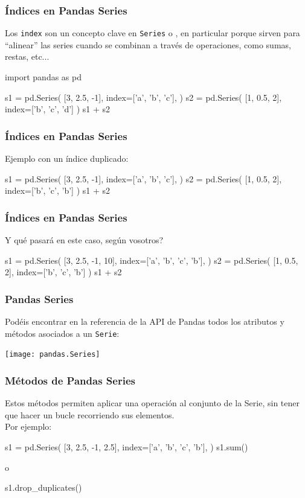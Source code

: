 \documentclass[9pt]{beamer}
\begin{document}
\begin{frame}[fragile]
 \frametitle{Índices en Pandas Series}
  Los {\tt index} son un concepto clave en {\tt Series} o , en particular porque sirven para ``alinear'' las series cuando se combinan a través de operaciones, como sumas, restas, etc...
  \begin{pyconcode}
import pandas as pd
  \end{pyconcode}
  \begin{pyconsole}
s1 = pd.Series(
        [3, 2.5, -1],
        index=['a', 'b', 'c'],
)
s2 = pd.Series(
        [1, 0.5, 2],
        index=['b', 'c', 'd']
)
s1 + s2        
  \end{pyconsole}
\end{frame}
\begin{frame}[fragile]
  \frametitle{Índices en Pandas Series}
  Ejemplo con un índice duplicado: 
  \begin{pyconsole}
s1 = pd.Series(
        [3, 2.5, -1],
        index=['a', 'b', 'c'],
)
s2 = pd.Series(
        [1, 0.5, 2],
        index=['b', 'c', 'b']
)
s1 + s2        
  \end{pyconsole}
\end{frame}
\begin{frame}[fragile]
  \frametitle{Índices en Pandas Series}
 Y qué pasará en este caso, según vosotros?
  \begin{pyconsole}
s1 = pd.Series(
        [3, 2.5, -1, 10],
        index=['a', 'b', 'c', 'b'],
)
s2 = pd.Series(
        [1, 0.5, 2],
        index=['b', 'c', 'b']
)
s1 + s2        
  \end{pyconsole}
\end{frame}
\begin{frame}
  \frametitle{Pandas Series}
  Podéis encontrar en la referencia de la API de Pandas todos los atributos y métodos asociados a un {\tt Serie}: \href{https://pandas.pydata.org/pandas-docs/stable/reference/api/pandas.Series.html}{}
        \begin{center}
        \texttt{[image: pandas.Series]}
      \end{center}
\end{frame}
\begin{frame}[fragile]
  \frametitle{Métodos de Pandas Series}
  Estos métodos permiten aplicar una operación al conjunto de la Serie, sin tener que hacer un bucle recorriendo sus elementos.\\
  Por ejemplo:
  \begin{pyconsole}
s1 = pd.Series(
        [3, 2.5, -1, 2.5],
        index=['a', 'b', 'c', 'b'],
)
s1.sum()
  \end{pyconsole}
\pause  o
  \begin{pyconsole}
s1.drop_duplicates()
  \end{pyconsole}
  
\end{frame}
\end{document}
